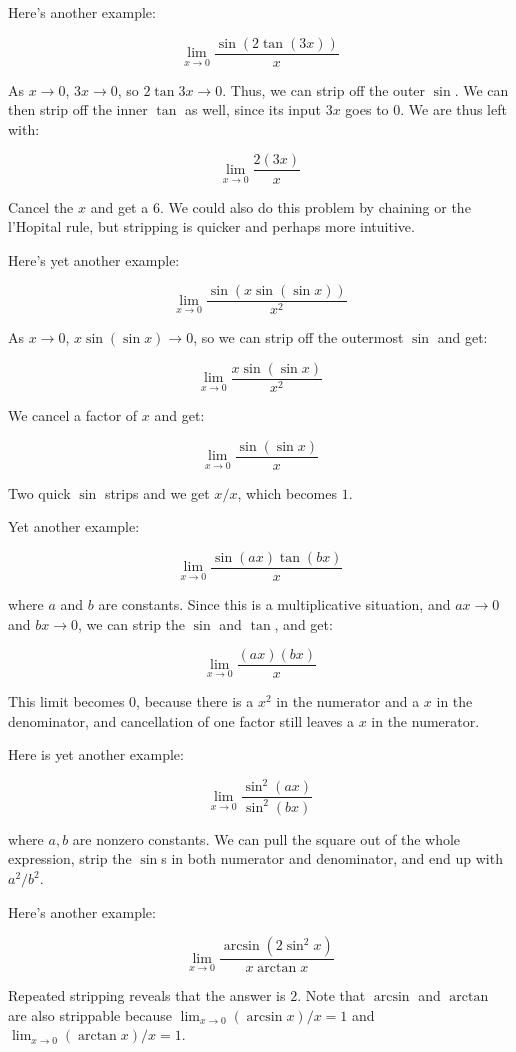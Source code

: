 \documentclass{amsart}
\begin{document}
Here's another example:

$$\lim_{x \to 0} \frac{\sin(2 \tan (3x))}{x}$$

As $x \to 0$, $3x \to 0$, so $2 \tan 3x \to 0$. Thus, we can strip off
the outer $\sin$. We can then strip off the inner $\tan$ as well,
since its input $3x$ goes to $0$. We are thus left with:

$$\lim_{x \to 0} \frac{2(3x)}{x}$$

Cancel the $x$ and get a $6$. We could also do this problem by
chaining or the l'Hopital rule, but stripping is quicker and perhaps
more intuitive.

Here's yet another example:

$$\lim_{x \to 0} \frac{\sin (x \sin (\sin x))}{x^2}$$

As $x \to 0$, $x \sin(\sin x) \to 0$, so we can strip off the
outermost $\sin$ and get:

$$\lim_{x \to 0} \frac{x \sin(\sin x)}{x^2}$$

We cancel a factor of $x$ and get:

$$\lim_{x \to 0} \frac{\sin(\sin x)}{x}$$

Two quick $\sin$ strips and we get $x/x$, which becomes $1$.

Yet another example:

$$\lim_{x \to 0} \frac{\sin(ax)\tan(bx)}{x}$$

where $a$ and $b$ are constants. Since this is a multiplicative
situation, and $ax \to 0$ and $bx \to 0$, we can strip the $\sin$ and
$\tan$, and get:

$$\lim_{x \to 0} \frac{(ax)(bx)}{x}$$

This limit becomes $0$, because there is a $x^2$ in the numerator and
a $x$ in the denominator, and cancellation of one factor still leaves
a $x$ in the numerator.

Here is yet another example:

$$\lim_{x \to 0} \frac{\sin^2(ax)}{\sin^2(bx)}$$

where $a,b$ are nonzero constants. We can pull the square out of the
whole expression, strip the $\sin$s in both numerator and denominator,
and end up with $a^2/b^2$.

Here's another example:

$$\lim_{x \to 0} \frac{\arcsin(2\sin^2x)}{x \arctan x}$$

Repeated stripping reveals that the answer is $2$. Note that $\arcsin$
and $\arctan$ are also strippable because $\lim_{x \to 0} (\arcsin
x)/x = 1$ and $\lim_{x \to 0} (\arctan x)/x = 1$.
\end{document}
